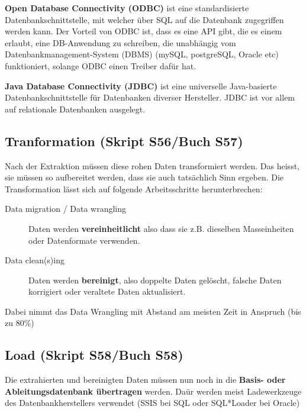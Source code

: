 \documentclass[a4paper, 11pt, nofootinbib]{article}
\begin{document}
\noindent \textbf{Open Database Connectivity (ODBC)} ist eine standardisierte Datenbankschnittstelle, mit welcher über SQL auf die Datenbank zugegriffen werden kann. Der Vorteil von ODBC ist, dass es eine API gibt, die es einem erlaubt, eine DB-Anwendung zu schreiben, die unabhängig vom Datenbankmanagement-System (DBMS) (mySQL, postgreSQL, Oracle etc) funktioniert, solange ODBC einen Treiber dafür hat.

\vspace{10px}

\noindent \textbf{Java Database Connectivity (JDBC)} ist eine universelle Java-basierte Datenbankschnittstelle für Datenbanken diverser Hersteller. JDBC ist vor allem auf relationale Datenbanken ausgelegt.


\subsection{Tranformation (Skript S56/Buch S57)}

Nach der Extraktion müssen diese rohen Daten transformiert werden. Das heisst, sie müssen so aufbereitet werden, dass sie auch tatsächlich Sinn ergeben. Die Transformation lässt sich auf folgende Arbeitsschritte herunterbrechen:

\begin{description}
	\item[Data migration / Data wrangling] Daten werden \textbf{vereinheitlicht} also dass sie z.B. dieselben Masseinheiten oder Datenformate verwenden.
	\item[Data clean(s)ing] Daten werden \textbf{bereinigt}, also doppelte Daten gelöscht, falsche Daten korrigiert oder veraltete Daten aktualisiert.
\end{description}

\vspace{10px}

\noindent Dabei nimmt das Data Wrangling mit Abstand am meisten Zeit in Anspruch (bis zu 80\%)


\subsection{Load (Skript S58/Buch S58)}

Die extrahierten und bereinigten Daten müssen nun noch in die \textbf{Basis- oder Ableitungsdatenbank übertragen} werden. Daür werden meist Ladewerkzeuge des Datenbankherstellers verwendet (SSIS bei SQL oder SQL*Loader bei Oracle)

\vspace{10px}
\end{document}
